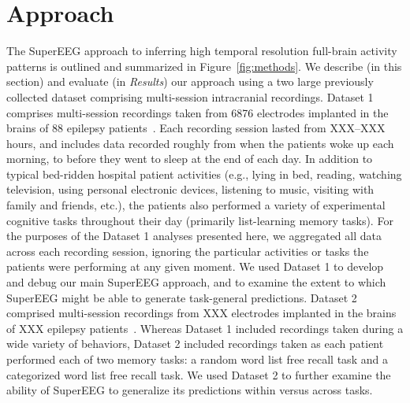 \documentclass[11pt]{article}
\begin{document}
\section*{Approach}
The SuperEEG approach to inferring high temporal resolution full-brain
activity patterns is outlined and summarized in
Figure~\ref{fig:methods}. We describe (in this section) and evaluate
(in \textit{Results}) our approach using a two large previously
collected dataset comprising multi-session intracranial recordings.
Dataset 1 comprises multi-session recordings taken from 6876
electrodes implanted in the brains of 88 epilepsy
patients~\cite{SedeEtal03, SedeEtal07a, SedeEtal07b, MannEtal11,
  MannEtal12}.  Each recording session lasted from XXX--XXX hours, and
includes data recorded roughly from when the patients woke up each
morning, to before they went to sleep at the end of each day.  In
addition to typical bed-ridden hospital patient activities (e.g.,
lying in bed, reading, watching television, using personal electronic
devices, listening to music, visiting with family and friends, etc.),
the patients also performed a variety of experimental cognitive tasks
throughout their day (primarily list-learning memory tasks).  For the
purposes of the Dataset 1 analyses presented here, we aggregated all
data across each recording session, ignoring the particular activities
or tasks the patients were performing at any given moment.  We used
Dataset 1 to develop and debug our main SuperEEG approach, and to
examine the extent to which SuperEEG might be able to generate
task-general predictions.  Dataset 2 comprised multi-session
recordings from XXX electrodes implanted in the brains of XXX epilepsy
patients~\citep{EzzyEtal17, HoraEtal17, KragEtal17, KuceEtal17,
  LinEtal17, SoloEtal18, WeidEtal18, EzzyEtal18, KuceEtal18}.  Whereas
Dataset 1 included recordings taken during a wide variety of
behaviors, Dataset 2 included recordings taken as each patient
performed each of two memory tasks: a random word list free recall
task and a categorized word list free recall task.  We used Dataset 2
to further examine the ability of SuperEEG to generalize its
predictions within versus across tasks.
\end{document}
